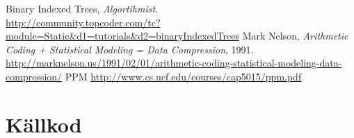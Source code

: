 \documentclass[a4paper,11pt]{article}
\begin{document}
\cite{fenwick}
\clearpage
\begin{thebibliography}{9}
    Binary Indexed Trees,
    \emph{Algortihmist}.\\
    \url{http://community.topcoder.com/tc?module=Static\&d1=tutorials\&d2=binaryIndexedTrees}
    Mark Nelson,
    \emph{Arithmetic Coding + Statistical Modeling = Data Compression}, 1991.\\
    \url{http://marknelson.us/1991/02/01/arithmetic-coding-statistical-modeling-data-compression/}
    PPM
    \url{http://www.cs.ucf.edu/courses/cap5015/ppm.pdf}

\end{thebibliography}

\clearpage
\section{Källkod}
%
%
%
%
%
%
\end{document}

